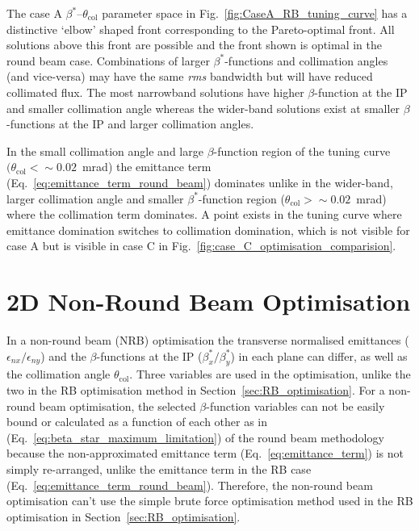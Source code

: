 \documentclass[../main.tex]{subfiles}
\begin{document}
The case A $\beta^{*}$--$\theta_{\mathrm{col}}$ parameter space in Fig.~\ref{fig:CaseA_RB_tuning_curve} has a distinctive `elbow' shaped front corresponding to the Pareto-optimal front. All solutions above this front are possible and the front shown is optimal in the round beam case. Combinations of larger $\beta^{*}$-functions and collimation angles (and vice-versa) may have the same \textit{rms} bandwidth but will have reduced collimated flux. The most narrowband solutions have higher $\beta$-function at the IP and smaller collimation angle whereas the wider-band solutions exist at smaller $\beta$-functions at the IP and larger collimation angles. 

In the small collimation angle and large $\beta$-function region of the tuning curve $(\theta_{\mathrm{col}}< \sim0.02$~\si{\milli\radian}) the emittance term (Eq.~\ref{eq:emittance_term_round_beam}) dominates unlike in the wider-band, larger collimation angle and smaller $\beta^{*}$-function region ($\theta_\mathrm{col} > \sim0.02$~\si{\milli\radian}) where the collimation term dominates. A point exists in the tuning curve where emittance domination switches to collimation domination, which is not visible for case A but is visible in case C in Fig.~\ref{fig:case_C_optimisation_comparision}. 

\section{2D Non-Round Beam Optimisation}
\label{sec:NRB_optimisation}

In a non-round beam (NRB) optimisation the transverse normalised emittances ($\epsilon_{nx}/\epsilon_{ny}$) and the $\beta$-functions at the IP ($\beta_{x}^{*}/\beta_{y}^{*}$) in each plane can differ, as well as the collimation angle $\theta_{\mathrm{col}}$. Three variables are used in the optimisation, unlike the two in the RB optimisation method in Section~\ref{sec:RB_optimisation}. For a non-round beam optimisation, the selected $\beta$-function variables can not be easily bound or calculated as a function of each other as in (Eq.~\ref{eq:beta_star_maximum_limitation}) of the round beam methodology because the non-approximated emittance term (Eq.~\ref{eq:emittance_term}) is not simply re-arranged, unlike the emittance term in the RB case (Eq.~\ref{eq:emittance_term_round_beam}). Therefore, the non-round beam optimisation can't use the simple brute force optimisation method used in the RB optimisation in Section~\ref{sec:RB_optimisation}.
\end{document}
